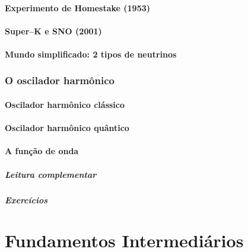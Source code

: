 \documentclass{header}
\begin{document}
            \subsection{Experimento de Homestake (1953)}
    
            \subsection{Super--K e SNO (2001)}
    
            \subsection{Mundo simplificado: 2 tipos de neutrinos}
    
        \section{O oscilador harmônico}
    
            \subsection{Oscilador harmônico clássico}
    
            \subsection{Oscilador harmônico quântico}
    
            \subsection{A função de onda}
    
        \subsubsection*{Leitura complementar}
    
        \subsubsection*{Exercícios}
    
\part{Fundamentos Intermediários}
    
\end{document}
